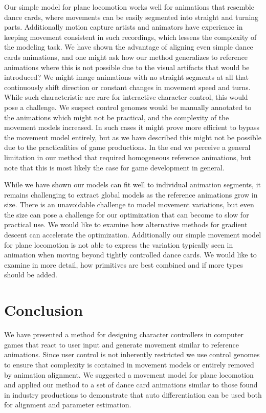 Our simple model for plane locomotion works well for animations that resemble dance cards, where movements can be easily segmented into straight and turning parts. Additionally motion capture artists and animators have experience in keeping movement consistent in such recordings, which lessens the complexity of the modeling task. We have shown the advantage of aligning even simple dance cards animations, and one might ask how our method generalizes to reference animations where this is not possible due to the visual artifacts that would be introduced? We might image animations with no straight segments at all that continuously shift direction or constant changes in movement speed and turns. While such characteristic are rare for interactive character control, this would pose a challenge. We suspect control genomes would be manually annotated to the animations which might not be practical, and the complexity of the movement models increased. In such cases it might prove more efficient to bypass the movement model entirely, but as we have described this might not be possible due to the practicalities of game productions. In the end we perceive a general limitation in our method that required homogeneous reference animations, but note that this is most likely the case for game development in general. 

While we have shown our models can fit well to individual animation segments, it remains challenging to extract global models as the reference animations grow in size. There is an unavoidable challenge to model movement variations, but even the size can pose a challenge for our optimization that can become to slow for practical use. We would like to examine how alternative methods for gradient descent can accelerate the optimization. 
Additionally our simple movement model for plane locomotion is not able to express the variation typically seen in animation when moving beyond tightly controlled dance cards. We would like to examine in more detail, how primitives are best combined and if more types should be added.

\section{Conclusion}
We have presented a method for designing character controllers in computer games that react to user input and generate movement similar to reference animations. Since user control is not inherently restricted we use control genomes to ensure that complexity is contained in movement models or entirely removed by animation alignment. We suggested a movement model for plane locomotion and applied our method to a set of dance card animations similar to those found in industry productions to demonstrate that auto differentiation can be used both for alignment and parameter estimation.  
